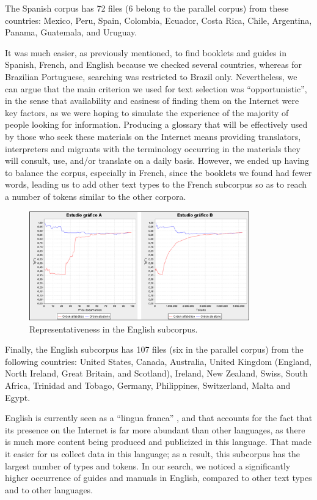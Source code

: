 \documentclass[english]{textolivre}
\begin{document}
The Spanish corpus has 72 files (6 belong to the parallel corpus) from these countries: Mexico, Peru, Spain, Colombia, Ecuador, Costa Rica, Chile, Argentina, Panama, Guatemala, and Uruguay.

It was much easier, as previously mentioned, to find booklets and guides in Spanish, French, and English because we checked several countries, whereas for Brazilian Portuguese, searching was restricted to Brazil only. Nevertheless, we can argue that the main criterion we used for text selection was “opportunistic”, in the sense that availability and easiness of finding them on the Internet were key factors, as we were hoping to simulate the experience of the majority of people looking for information. Producing a glossary that will be effectively used by those who seek these materials on the Internet means providing translators, interpreters and migrants with the terminology occurring in the materials they will consult, use, and/or translate on a daily basis. However, we ended up having to balance the corpus, especially in French, since the booklets we found had fewer words, leading us to add other text types to the French subcorpus so as to reach a number of tokens similar to the other corpora.

\begin{figure}[htbp]
\centering
\includegraphics[width=0.85\textwidth]{Figura09.png}
\caption{Representativeness in the English subcorpus.}
\label{Figura09}
\end{figure}

Finally, the English subcorpus has 107 files (six in the parallel corpus) from the following countries: United States, Canada, Australia, United Kingdom (England, North Ireland, Great Britain, and Scotland), Ireland, New Zealand, Swiss, South Africa, Trinidad and Tobago, Germany, Philippines, Switzerland, Malta and Egypt.

English is currently seen as a “lingua franca” \cite{hoffman_spread_2000}, and that accounts for the fact that its presence on the Internet is far more abundant than other languages, as there is much more content being produced and publicized in this language. That made it easier for us collect data in this language; as a result, this subcorpus has the largest number of types and tokens. In our search, we noticed a significantly higher occurrence of guides and manuals in English, compared to other text types and to other languages.
\end{document}
